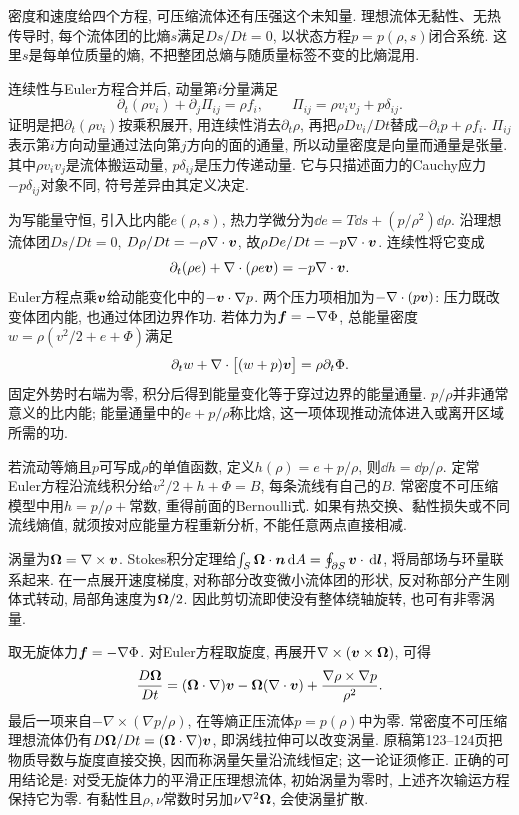 密度和速度给四个方程, 可压缩流体还有压强这个未知量. 理想流体无黏性、无热传导时, 每个流体团的比熵$s$满足$Ds/Dt=0$, 以状态方程$p=p(\rho,s)$闭合系统. 这里$s$是每单位质量的熵, 不把整团总熵与随质量标签不变的比熵混用.

连续性与Euler方程合并后, 动量第$i$分量满足
\[
\partial_t(\rho v_i)+\partial_j\Pi_{ij}=\rho f_i,
\qquad \Pi_{ij}=\rho v_iv_j+p\delta_{ij}.
\]
证明是把$\partial_t(\rho v_i)$按乘积展开, 用连续性消去$\partial_t\rho$, 再把$\rho Dv_i/Dt$替成$-\partial_ip+\rho f_i$. $\Pi_{ij}$表示第$i$方向动量通过法向第$j$方向的面的通量, 所以动量密度是向量而通量是张量. 其中$\rho v_iv_j$是流体搬运动量, $p\delta_{ij}$是压力传递动量. 它与只描述面力的Cauchy应力$-p\delta_{ij}$对象不同, 符号差异由其定义决定.

为写能量守恒, 引入比内能$e(\rho,s)$, 热力学微分为$\dd e=T\dd s+(p/\rho^2)\dd\rho$. 沿理想流体团$Ds/Dt=0$, $D\rho/Dt=-\rho\nabla\cdot\boldsymbol{v}$, 故$\rho De/Dt=-p\nabla\cdot\boldsymbol{v}$. 连续性将它变成
\[
\partial_t(\rho e)+\nabla\cdot(\rho e\boldsymbol{v})
=-p\nabla\cdot\boldsymbol{v}.
\]
Euler方程点乘$\boldsymbol{v}$给动能变化中的$-\boldsymbol{v}\cdot\nabla p$. 两个压力项相加为$-\nabla\cdot(p\boldsymbol{v})$: 压力既改变体团内能, 也通过体团边界作功. 若体力为$\boldsymbol{f}=-\nabla\Phi$, 总能量密度$w=\rho(v^2/2+e+\Phi)$满足
\[
\partial_tw+\nabla\cdot\bigl[(w+p)\boldsymbol{v}\bigr]
=\rho\partial_t\Phi.
\]
固定外势时右端为零, 积分后得到能量变化等于穿过边界的能量通量. $p/\rho$并非通常意义的比内能; 能量通量中的$e+p/\rho$称比焓, 这一项体现推动流体进入或离开区域所需的功.

若流动等熵且$p$可写成$\rho$的单值函数, 定义$h(\rho)=e+p/\rho$, 则$\dd h=\dd p/\rho$. 定常Euler方程沿流线积分给$v^2/2+h+\Phi=B$, 每条流线有自己的$B$. 常密度不可压缩模型中用$h=p/\rho+$常数, 重得前面的Bernoulli式. 如果有热交换、黏性损失或不同流线熵值, 就须按对应能量方程重新分析, 不能任意两点直接相减.

涡量为$\boldsymbol{\Omega}=\nabla\times\boldsymbol{v}$. Stokes积分定理给$\int_S\boldsymbol{\Omega}\cdot\boldsymbol{n}\,\mathrm d A=\oint_{\partial S}\boldsymbol{v}\cdot\,\mathrm d\boldsymbol{l}$, 将局部场与环量联系起来. 在一点展开速度梯度, 对称部分改变微小流体团的形状, 反对称部分产生刚体式转动, 局部角速度为$\boldsymbol{\Omega}/2$. 因此剪切流即使没有整体绕轴旋转, 也可有非零涡量.

取无旋体力$\boldsymbol{f}=-\nabla\Phi$. 对Euler方程取旋度, 再展开$\nabla\times(\boldsymbol{v}\times\boldsymbol{\Omega})$, 可得
\[
\frac{D\boldsymbol{\Omega}}{Dt}
=(\boldsymbol{\Omega}\cdot\nabla)\boldsymbol{v}
-\boldsymbol{\Omega}(\nabla\cdot\boldsymbol{v})
+\frac{\nabla\rho\times\nabla p}{\rho^2}.
\]
最后一项来自$-\nabla\times(\nabla p/\rho)$, 在等熵正压流体$p=p(\rho)$中为零. 常密度不可压缩理想流体仍有$D\boldsymbol{\Omega}/Dt=(\boldsymbol{\Omega}\cdot\nabla)\boldsymbol{v}$, 即涡线拉伸可以改变涡量. 原稿第123--124页把物质导数与旋度直接交换, 因而称涡量矢量沿流线恒定; 这一论证须修正. 正确的可用结论是: 对受无旋体力的平滑正压理想流体, 初始涡量为零时, 上述齐次输运方程保持它为零. 有黏性且$\rho,\nu$常数时另加$\nu\nabla^2\boldsymbol{\Omega}$, 会使涡量扩散.

